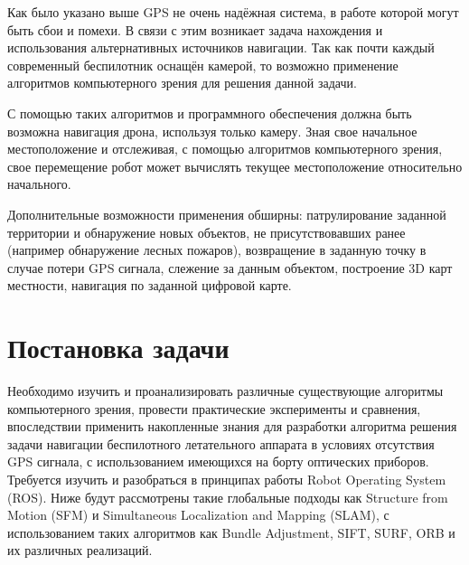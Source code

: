 Как было указано выше GPS не очень надёжная система, в работе которой могут быть сбои и помехи. В связи с этим возникает задача нахождения и использования альтернативных источников навигации. Так как почти каждый современный беспилотник оснащён камерой, то возможно применение алгоритмов компьютерного зрения для решения данной задачи.

С помощью таких алгоритмов и программного обеспечения должна быть возможна навигация дрона, используя только камеру. Зная свое начальное местоположение и отслеживая, с помощью алгоритмов компьютерного зрения, свое перемещение робот может вычислять текущее местоположение относительно начального.

Дополнительные возможности применения обширны: патрулирование заданной территории и обнаружение новых объектов, не присутствовавших ранее (например обнаружение лесных пожаров), возвращение в заданную точку в случае потери GPS сигнала, слежение за данным объектом, построение 3D карт местности, навигация по заданной цифровой карте.

\section{Постановка задачи}

Необходимо изучить и проанализировать различные существующие алгоритмы компьютерного зрения, провести практические эксперименты и сравнения, впоследствии применить накопленные знания для разработки алгоритма решения задачи навигации беспилотного летательного аппарата в условиях отсутствия GPS сигнала, с использованием имеющихся на борту оптических приборов. Требуется изучить и разобраться в принципах работы Robot Operating System (ROS). Ниже будут рассмотрены такие глобальные подходы как Structure from Motion (SFM) и Simultaneous Localization and Mapping (SLAM), с использованием таких алгоритмов как Bundle Adjustment, SIFT, SURF, ORB и их различных реализаций.

